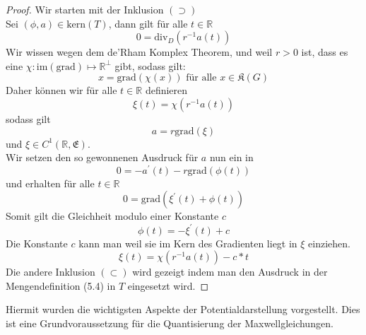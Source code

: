 \documentclass[11pt,a4paper,leqno]{report}
\numberwithin{equation}{chapter}
\begin{document}
\begin{proof}
Wir starten mit der Inklusion $(\supset)$\\
Sei $(\phi, a)\in \text{kern}(T)$, dann gilt f\"ur alle $t\in\mathbb{R}$
\begin{equation*}
	0 = \text{div}_D(r^{-1}a(t))
\end{equation*} 
Wir wissen wegen dem de'Rham Komplex Theorem, und weil $r>0$ ist, dass es eine  $\chi:\text{im}(\text{grad})\mapsto \mathbb{R}^\perp$ gibt, sodass gilt:
\begin{equation*}
	x = \text{grad}(\chi(x)) \text{ f\"ur  alle }x\in\mathfrak{K}(G)
\end{equation*}
Daher k\"onnen wir f\"ur alle $t\in\mathbb{R}$ definieren 
\begin{equation*}
\xi(t) = \chi(r^{-1}a(t))
\end{equation*} sodass gilt
\begin{equation*}
	a=r\text{grad}(\xi)
\end{equation*} und $\xi\in C^1(\mathbb{R},\mathfrak{E})$.\\
Wir setzen den so gewonnenen Ausdruck f\"ur $a$ nun ein in
\begin{equation*}
	0=-a^\prime(t) - r\text{grad}(\phi(t))
\end{equation*} 
und erhalten f\"ur alle $t\in\mathbb{R}$
\begin{equation*}
0=\text{grad}(\xi^\prime(t)+\phi(t))
\end{equation*} 
Somit gilt die Gleichheit modulo einer Konstante $c$
\begin{equation*}
\phi(t)=-\xi^\prime(t) +c
\end{equation*}
Die Konstante $c$ kann man weil sie im Kern des Gradienten liegt in $\xi$ einziehen.
\begin{equation*}
	\xi(t) = \chi(r^{-1}a(t)) -c*t
\end{equation*}
\noindent
Die andere Inklusion $(\subset)$ wird gezeigt indem man den Ausdruck in der Mengendefinition (5.4) in $T$ eingesetzt wird.
\end{proof}
\noindent
Hiermit wurden die wichtigsten Aspekte der Potentialdarstellung vorgestellt. Dies ist eine Grundvoraussetzung f\"ur die Quantisierung der Maxwellgleichungen.
\end{document}

